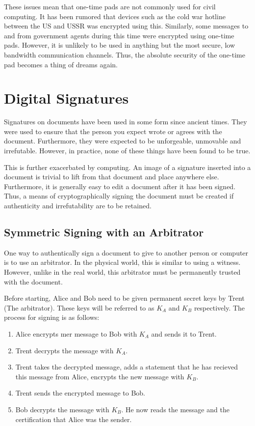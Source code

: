 		These issues mean that one-time pads are not commonly used for civil computing. 
		It has been rumored that devices such as the cold war hotline between the US and USSR was encrypted using this. 
		Similarly, some messages to and from government agents during this time were encrypted using one-time pads. 
		However, it is unlikely to be used in anything but the most secure, low bandwidth communication channels. 
		Thus, the absolute security of the one-time pad becomes a thing of dreams again. 
	\section{Digital Signatures}
		Signatures on documents have been used in some form since ancient times. 
		They were used to ensure that the person you expect wrote or agrees with the document. 
		Furthermore, they were expected to be unforgeable, unmovable and irrefutable. 
		However, in practice, none of these things have been found to be true. 

		This is further exacerbated by computing. 
		An image of a signature inserted into a document is trivial to lift from that document and place anywhere else. 
		Furthermore, it is generally easy to edit a document after it has been signed. 
		Thus, a means of cryptographically signing the document must be created if authenticity and irrefutability are to be retained. 

		\subsection{Symmetric Signing with an Arbitrator}
			One way to authentically sign a document to give to another person or computer is to use an arbitrator. 
			In the physical world, this is similar to using a witness. 
			However, unlike in the real world, this arbitrator must be permanently trusted with the document. 

			Before starting, Alice and Bob need to be given permanent secret keys by Trent (The arbitrator). 
			These keys will be referred to as $K_A$ and $K_B$ respectively. 
			The process for signing is as follows:
			\begin{enumerate}
				\item Alice encrypts mer message to Bob with $K_A$ and sends it to Trent. 
				\item Trent decrypts the message with $K_A$. 
				\item Trent takes the decrypted message, adds a statement that he has recieved this message from Alice, encrypts the new message with $K_B$.
				\item Trent sends the encrypted message to Bob. 
				\item Bob decrypts the message with $K_B$. He now reads the message and the certification that Alice was the sender.
			\end{enumerate}

